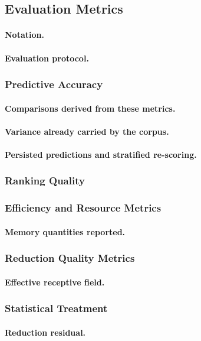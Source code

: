 \subsection{Evaluation Metrics}
\label{sec:method:experiment:metrics}

\paragraph{Notation.}

\paragraph{Evaluation protocol.}

\subsubsection{Predictive Accuracy}
\label{sec:method:experiment:metrics:accuracy}

\paragraph{Comparisons derived from these metrics.}

\paragraph{Variance already carried by the corpus.}

\paragraph{Persisted predictions and stratified re-scoring.}

\subsubsection{Ranking Quality}
\label{sec:method:experiment:metrics:ranking}

\subsubsection{Efficiency and Resource Metrics}
\label{sec:method:experiment:metrics:efficiency}

\paragraph{Memory quantities reported.}

\subsubsection{Reduction Quality Metrics}
\label{sec:method:experiment:metrics:reduction}

\paragraph{Effective receptive field.}

\subsubsection{Statistical Treatment}
\label{sec:method:experiment:metrics:stats}

\paragraph{Reduction residual.}
\label{sec:method:experiment:metrics:residual}
